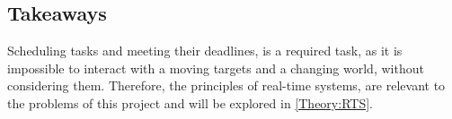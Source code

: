 \subsection{Takeaways}
Scheduling tasks and meeting their deadlines, is a required task, as it is impossible to interact with a moving targets and a changing world, without considering them. 
Therefore, the principles of real-time systems, are relevant to the problems of this project and will be explored in \autoref{Theory:RTS}.

